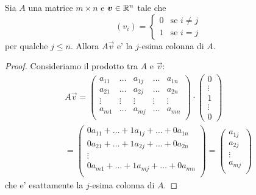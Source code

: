 \begin{proposition} \label{j-esima_colonna}
    Sia $A$ una matrice $m \times n$ e $\bm{v} \in \mathbb{R}^n$ tale che \[(v_i) = \begin{cases}
        0 &\text{se } i \neq j \\
        1 &\text{se } i = j 
    \end{cases}
    \] per qualche $j \leq n$. Allora $A\vec v$ e' la $j$-esima colonna di $A$.
\end{proposition}
\begin{proof}
    Consideriamo il prodotto tra $A$ e $\vec v$: \begin{gather*}
        A\vec v = \begin{pmatrix}
            a_{11}  & \dots   & a_{1j} & \dots  & a_{1n} \\
            a_{21}  & \dots   & a_{2j} & \dots  & a_{2n} \\
            \vdots  & \vdots  & \vdots & \vdots & \vdots \\
            a_{m1}  & \dots   & a_{mj} & \dots  & a_{mn} \\
        \end{pmatrix} \cdot   \begin{pmatrix}
            0 \\ \vdots \\ 1 \\ \vdots \\ 0 
        \end{pmatrix} \\
        = \begin{pmatrix}
            0a_{11}  + \dots   + 1a_{1j} + \dots  + 0a_{1n} \\
            0a_{21}  + \dots   + 1a_{2j} + \dots  + 0a_{2n} \\
            \vdots \\
            0a_{m1}  + \dots   + 1a_{mj} + \dots  + 0a_{mn} \\
        \end{pmatrix} = \begin{pmatrix}
            a_{1j}\\
            a_{2j}\\
            \vdots \\
            a_{mj} \\
        \end{pmatrix}
    \end{gather*}
    che e' esattamente la $j$-esima colonna di $A$.
\end{proof}

